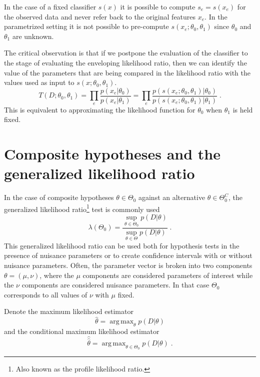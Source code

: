 \documentclass[aoas,preprint]{imsart}
\DeclareMathOperator*{\argmax}{arg\,max}
\numberwithin{equation}{section}
\theoremstyle{plain}
\begin{document}
In the case of a fixed classifier $s(x)$ it is possible to compute $s_e=s(x_e)$ for the observed data and never refer back to the original features $x_e$. In the parametrized setting it is not possible to pre-compute $s(x_e; \theta_0, \theta_1)$ since $\theta_0$ and $\theta_1$ are unknown.

The critical observation is that  if we postpone the evaluation of the classifier to the stage of evaluating the enveloping likelihood ratio, then we can identify the value of the parameters  that are being compared in the likelihood ratio with the values used as input to $s(x;\theta_0, \theta_1)$.  
\begin{equation}\label{eq:embedding}
T(D; \theta_0, \theta_1) = \prod_e \frac{p(x_e|\theta_0)}{p(x_e|\theta_1)} = \prod_e  \frac{ p (s(x_e; \theta_0, \theta_1) | \theta_0)}
{p (s(x_e; \theta_0,  \theta_1) | \theta_1) } \; .
\end{equation}
This is equivalent to approximating the likelihood function for $\theta_0$  when $\theta_1$ is held fixed.




\section{Composite hypotheses and the generalized likelihood ratio}\label{S:GLR}

In the case of composite hypotheses $\theta \in \Theta_0$ against an alternative $\theta \in \Theta_0^C$, the generalized likelihood ratio\footnote{Also known as the profile likelihood ratio.} test is commonly used
\begin{equation}
\lambda(\Theta_0) =  \frac{ \sup_{\theta \in \Theta_0} p(D | \theta)}{ \sup_{\theta \in \Theta} p(D | \theta)} \; .
\end{equation}
This generalized likelihood ratio can be used both for hypothesis tests in the presence of nuisance parameters or to create confidence intervals with or without nuisance parameters.  Often, the parameter vector is broken into two components $\theta=(\mu,\nu)$, where the $\mu$ components are considered parameters of interest while the $\nu$ components are considered nuisance parameters. In that case $\Theta_0$ corresponds to all values of $\nu$ with $\mu$ fixed.

Denote the maximum likelihood estimator
\begin{equation}\label{eq:mle}
\hat{\theta} = \argmax_\theta  p(D | \theta)
\end{equation}
and the conditional maximum likelihood estimator
\begin{equation}\label{eq:cmle}
\hat{\hat{\theta}} = \argmax_{\theta \in \Theta_0}  p(D | \theta) \; .
\end{equation}
\end{document}
